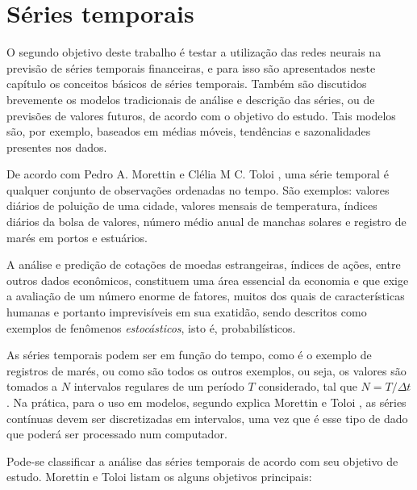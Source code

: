 

\chapter{Séries temporais}
\label{cap:series}

O segundo objetivo deste trabalho é testar a utilização das redes neurais na previsão de séries temporais financeiras, e para isso são apresentados neste capítulo os conceitos básicos de séries temporais. Também são discutidos brevemente os modelos tradicionais de análise e descrição das séries, ou de previsões de valores futuros, de acordo com o objetivo do estudo. Tais modelos são, por exemplo, baseados em médias móveis, tendências e sazonalidades presentes nos dados.

De acordo com Pedro A. Morettin e Clélia M C. Toloi \citep{morettin}, uma série temporal é qualquer conjunto de observações ordenadas no tempo. São exemplos: valores diários de poluição de uma cidade, valores mensais de temperatura, índices diários da bolsa de valores, número médio anual de manchas solares e registro de marés em portos e estuários.

A análise e predição de cotações de moedas estrangeiras, índices de ações, entre outros dados econômicos, constituem uma área essencial da economia e que exige a avaliação de um número enorme de fatores, muitos dos quais de características humanas e portanto imprevisíveis em sua exatidão, sendo descritos como exemplos de fenômenos \emph{estocásticos}, isto é, probabilísticos.

As séries temporais podem ser  em função do tempo, como é o exemplo de registros de marés, ou  como são todos os outros exemplos, ou seja, os valores são tomados a $N$ intervalos regulares de um período $T$ considerado, tal que $N = T/\Delta t$. Na prática, para o uso em modelos, segundo explica Morettin e Toloi \citep{morettin}, as séries contínuas devem ser discretizadas em intervalos, uma vez que é esse tipo de dado que poderá ser processado num computador.

Pode-se classificar a análise das séries temporais de acordo com seu objetivo de estudo. Morettin e Toloi \citep{morettin} listam os alguns objetivos principais:

